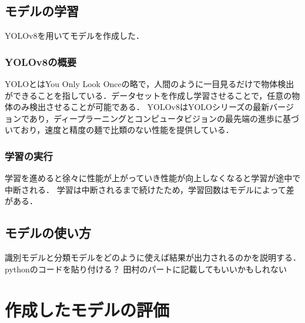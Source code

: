 \begin{multicols*}{2}


\subsection{モデルの学習}
YOLOv8を用いてモデルを作成した．
\subsubsection{YOLOv8の概要}
YOLOとはYou Only Look Onceの略で，人間のように一目見るだけで物体検出ができることを指している．データセットを作成し学習させることで，任意の物体のみ検出させることが可能である．
YOLOv8はYOLOシリーズの最新バージョンであり，ディープラーニングとコンピュータビジョンの最先端の進歩に基づいており，速度と精度の麺で比類のない性能を提供している．


\subsubsection{学習の実行}
学習を進めると徐々に性能が上がっていき性能が向上しなくなると学習が途中で中断される．
学習は中断されるまで続けたため，学習回数はモデルによって差がある．

\subsection{モデルの使い方}
識別モデルと分類モデルをどのように使えば結果が出力されるのかを説明する．pythonのコードを貼り付ける？
田村のパートに記載してもいいかもしれない
\section{作成したモデルの評価}


\end{multicols*}
